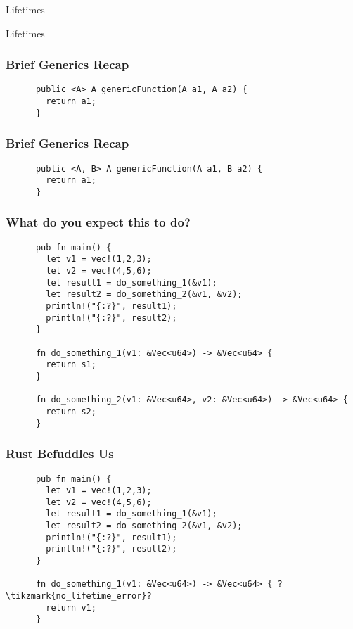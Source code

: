 \begin{section}{Lifetimes}


  \begin{frame}
    \centerline{
      \huge{Lifetimes}
    }
  \end{frame}

  \begin{frame}[fragile]
    \frametitle{Brief Generics Recap}
    \begin{verbatim}
      public <A> A genericFunction(A a1, A a2) {
        return a1;
      }
    \end{verbatim}
  \end{frame}

  \begin{frame}[fragile]
    \frametitle{Brief Generics Recap}
    \begin{verbatim}
      public <A, B> A genericFunction(A a1, B a2) {
        return a1;
      }
    \end{verbatim}
  \end{frame}

  \begin{frame}[fragile]
    \frametitle{What do you expect this to do? \cite{RustLangEd}}
    \begin{verbatim}
      pub fn main() {
        let v1 = vec!(1,2,3);
        let v2 = vec!(4,5,6);
        let result1 = do_something_1(&v1);
        let result2 = do_something_2(&v1, &v2);
        println!("{:?}", result1);
        println!("{:?}", result2);
      }

      fn do_something_1(v1: &Vec<u64>) -> &Vec<u64> {
        return s1;
      }

      fn do_something_2(v1: &Vec<u64>, v2: &Vec<u64>) -> &Vec<u64> {
        return s2;
      }
    \end{verbatim}
  \end{frame}

  \begin{frame}[fragile]
    \frametitle{Rust Befuddles Us}
    \begin{verbatim}
      pub fn main() {
        let v1 = vec!(1,2,3);
        let v2 = vec!(4,5,6);
        let result1 = do_something_1(&v1);
        let result2 = do_something_2(&v1, &v2);
        println!("{:?}", result1);
        println!("{:?}", result2);
      }

      fn do_something_1(v1: &Vec<u64>) -> &Vec<u64> { ?\tikzmark{no_lifetime_error}?
        return v1;
      }


\end{verbatim}
\end{frame}
\end{section}
